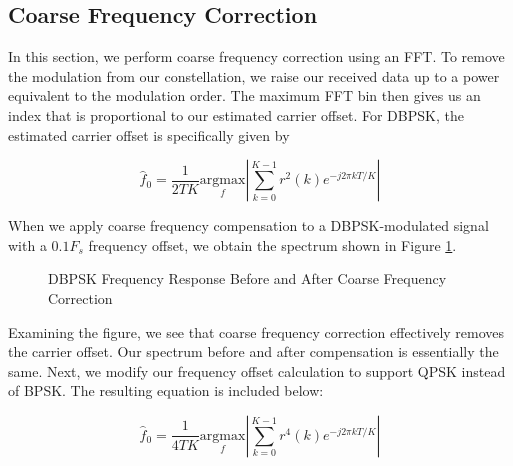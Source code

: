 \documentclass{article}
\begin{document}
\subsection{Coarse Frequency Correction}

In this section, we perform coarse frequency correction using an FFT. To remove the modulation from our constellation, we raise our received data up to a power equivalent to the modulation order. The maximum FFT bin then gives us an index that is proportional to our estimated carrier offset. For DBPSK, the estimated carrier offset is specifically given by

\begin{equation}
	\hat{f}_0 = \frac{1}{2TK}\underset{f}{\text{argmax}}\left\vert\sum_{k=0}^{K-1}{r^2(k)e^{-j2{\pi}kT/K}}\right\vert
\end{equation}
	
\noindent When we apply coarse frequency compensation to a DBPSK-modulated signal with a $0.1F_s$ frequency offset, we obtain the spectrum shown in Figure \ref{fig::psd_bpsk_with_cfc}.

\begin{figure}[H]
	\centerline{}
	\caption{DBPSK Frequency Response Before and After Coarse Frequency Correction}
	\label{fig::psd_bpsk_with_cfc}
\end{figure}

\noindent Examining the figure, we see that coarse frequency correction effectively removes the carrier offset. Our spectrum before and after compensation is essentially the same. Next, we modify our frequency offset calculation to support QPSK instead of BPSK. The resulting equation is included below:

\begin{equation}
	\hat{f}_0 = \frac{1}{4TK}\underset{f}{\text{argmax}}\left\vert\sum_{k=0}^{K-1}{r^4(k)e^{-j2{\pi}kT/K}}\right\vert
\end{equation}
\end{document}
